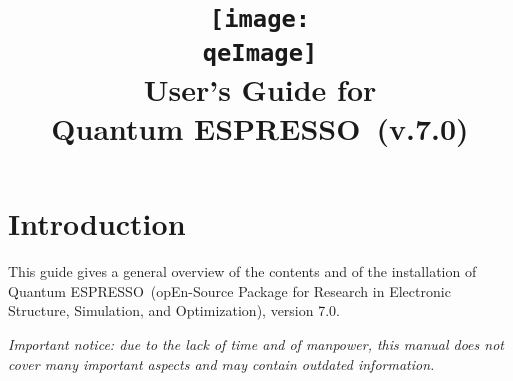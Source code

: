 \documentclass[12pt,a4paper]{article}
\def\version{7.0}
\def\qe{{\sc Quantum ESPRESSO}}
\begin{document}
\author{}
\date{}

\def\qeImage{quantum_espresso}

\title{
  \texttt{[image: \\qeImage]} \\
  \Huge User's Guide for \\ \qe\ (v.\version)
}

\maketitle

\tableofcontents

\section{Introduction}

This guide gives a general overview of the contents and of the installation
of \qe\ (opEn-Source Package for Research in Electronic Structure, Simulation,
and Optimization), version \version.

{\em Important notice: due to the lack of time and of manpower, this
  manual does not cover many important aspects and may contain outdated
  information.}
\end{document}
